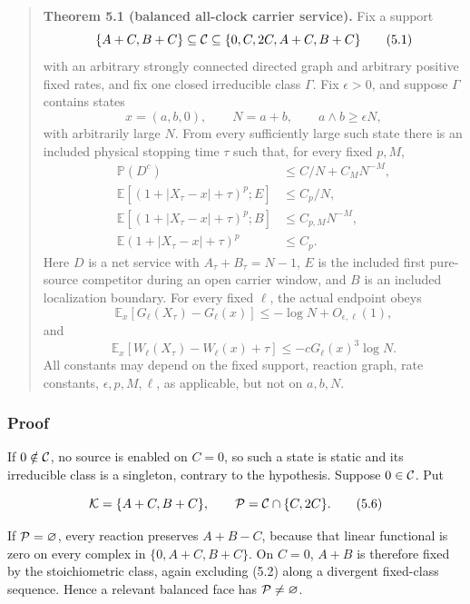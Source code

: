 \begin{quote}
\textbf{Theorem 5.1 (balanced all-clock carrier service).} Fix a support
\[
 \{A+C,B+C\}\subseteq{\cal C}
      \subseteq\{0,C,2C,A+C,B+C\}                            \tag{5.1}
\] with an arbitrary strongly connected directed graph and arbitrary
positive fixed rates, and fix one closed irreducible class \(\Gamma\).
Fix \(\epsilon>0\), and suppose \(\Gamma\) contains states \[
      x=(a,b,0),\qquad N=a+b,\qquad
      a\wedge b\ge\epsilon N,                                \tag{5.2}
\] with arbitrarily large \(N\). From every sufficiently large such
state there is an included physical stopping time \(\tau\) such that,
for every fixed \(p,M\), \[
\begin{aligned}
\mathbb P(D^c)&\le C/N+C_{M}N^{-M},\\
\mathbb E[(1+\lvert X_\tau-x\rvert+\tau)^p;E]&\le C_p/N,\\
\mathbb E[(1+\lvert X_\tau-x\rvert+\tau)^p;B]&\le C_{p,M}N^{-M},\\
\mathbb E(1+\lvert X_\tau-x\rvert+\tau)^p&\le C_p.
\end{aligned}
\tag{5.3}
\] Here \(D\) is a net service with \(A_\tau+B_\tau=N-1\), \(E\) is the
included first pure-source competitor during an open carrier window, and
\(B\) is an included localization boundary. For every fixed \(\ell\),
the actual endpoint obeys \[
\mathbb E_x[G_\ell(X_\tau)-G_\ell(x)]
      \le-\log N+O_{\epsilon,\ell}(1),                         \tag{5.4}
\] and \[
\mathbb E_x[W_\ell(X_\tau)-W_\ell(x)+\tau]
      \le-cG_\ell(x)^3\log N.                                 \tag{5.5}
\] All constants may depend on the fixed support, reaction graph, rate
constants, \(\epsilon,p,M,\ell\), as applicable, but not on \(a,b,N\).
\end{quote}

\subsubsection{Proof}

If \(0\notin{\cal C}\), no source is enabled on \(C=0\), so such a state
is static and its irreducible class is a singleton, contrary to the
hypothesis. Suppose \(0\in{\cal C}\). Put

\[
 {\cal K}=\{A+C,B+C\},\qquad
 {\cal P}={\cal C}\cap\{C,2C\}.                                \tag{5.6}
\]

If \({\cal P}=\varnothing\), every reaction preserves \(A+B-C\), because
that linear functional is zero on every complex in \(\{0,A+C,B+C\}\). On
\(C=0\), \(A+B\) is therefore fixed by the stoichiometric class, again
excluding (5.2) along a divergent fixed-class sequence. Hence a relevant
balanced face has \({\cal P}\ne\varnothing\).


